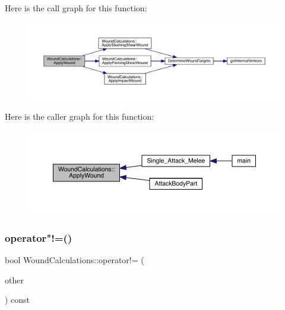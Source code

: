 Here is the call graph for this function\+:
\nopagebreak
\begin{figure}[H]
\begin{center}
\leavevmode
\includegraphics[width=350pt]{class_wound_calculations_a8143ba01702cf1a1072d17ee7deab4e0_cgraph}
\end{center}
\end{figure}
Here is the caller graph for this function\+:
\nopagebreak
\begin{figure}[H]
\begin{center}
\leavevmode
\includegraphics[width=350pt]{class_wound_calculations_a8143ba01702cf1a1072d17ee7deab4e0_icgraph}
\end{center}
\end{figure}
\mbox{\label{class_wound_calculations_ad2b94568adacf5e0d0ede9fa639de88c}} 
\subsubsection{\texorpdfstring{operator"!=()}{operator!=()}}
{\footnotesize\ttfamily bool Wound\+Calculations\+::operator!= (\begin{DoxyParamCaption}\item[{\mbox{\hyperlink{class_wound_calculations}{Wound\+Calculations}} \&}]{other }\end{DoxyParamCaption}) const}

\mbox{\label{class_wound_calculations_a539972ef16a667af23ccdd51246277f3}} 
